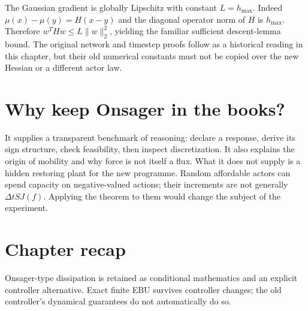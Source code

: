 The Gaussian gradient is globally Lipschitz with constant
$L=h_{\max}$. Indeed $\mu(x)-\mu(y)=H(x-y)$ and the diagonal operator
norm of $H$ is $h_{\max}$. Therefore
$w^THw\leq L\|w\|_2^2$, yielding the familiar sufficient descent-lemma
bound. The original network and timestep proofs follow as a historical reading in this chapter, but their old numerical constants must not be copied over the new
Hessian or a different actor law.

\section{Why keep Onsager in the books?}
It supplies a transparent benchmark of reasoning: declare a response,
derive its sign structure, check feasibility, then inspect discretization.
It also explains the origin of mobility and why force is not itself a flux.
What it does not supply is a hidden restoring plant for the new programme.
Random affordable actors can spend capacity on negative-valued actions;
their increments are not generally $\Delta t SJ(f)$. Applying the theorem
to them would change the subject of the experiment.

\section*{Chapter recap}
Onsager-type dissipation is retained as conditional mathematics and an
explicit controller alternative. Exact finite EBU survives controller
changes; the old controller's dynamical guarantees do not automatically do so.
